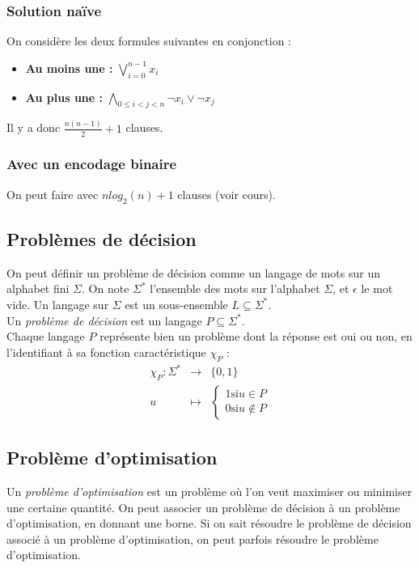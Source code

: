 \documentclass[a4paper]{article}
\begin{document}
    \subsubsection{Solution naïve}
    On considère les deux formules suivantes en conjonction :
    \begin{itemize}
      \item \textbf{Au moins une :} $\bigvee^{n-1}_{i=0} x_i$
      \item \textbf{Au plus une :} $\bigwedge_{0 \leq i < j < n} \lnot 
x_i \lor \lnot x_j $
    \end{itemize}
    Il y a donc $\frac{n(n-1)}{2} + 1$ clauses.

    \subsubsection{Avec un encodage binaire}
    On peut faire avec $n log_2(n) + 1$ clauses (voir cours).

  \subsection{Problèmes de décision}
  On peut définir un problème de décision comme un langage de mots sur 
un alphabet
  fini $\Sigma$. On note $\Sigma^*$ l'ensemble des mots sur l'alphabet 
$\Sigma$, et
  $\epsilon$ le mot vide. Un langage sur $\Sigma$ est un sous-ensemble 
$L \subseteq \Sigma^*$. \\

  Un \textit{problème de décision} est un langage $P \subseteq 
\Sigma^*$.\\

  Chaque langage $P$ représente bien un problème dont la réponse est oui 
ou non, 
  en l'identifiant à sa fonction caractéristique $\chi_P$ :
  \begin{align*}
    \chi_P : \Sigma^* & \rightarrow & \{0,1\} \\
    u & \mapsto & \begin{cases}1 \text{si} u \in P \\ 0 \text{si} u \not 
\in P\end{cases}
  \end{align*}

  \subsection{Problème d'optimisation}
  Un \textit{problème d'optimisation} est un problème où l'on veut 
maximiser ou
  minimiser une certaine quantité. On peut associer un problème de 
décision à un
  problème d'optimisation, en donnant une borne. Si on sait résoudre le 
problème
  de décision associé à un problème d'optimisation, on peut parfois 
résoudre le
  problème d'optimisation.
\end{document}
